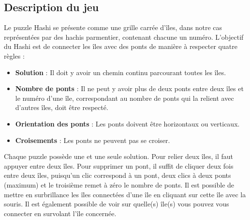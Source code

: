 \subsection{Description du jeu}
Le puzzle Hashi se présente comme une grille carrée d'îles, dans notre cas représentées par des hachis parmentier, contenant chacune un numéro. 
L'objectif du Hashi est de connecter les îles avec des ponts de manière à respecter quatre règles :
\begin{itemize}
\item \textbf{Solution} : Il doit y avoir un chemin continu parcourant toutes les îles.
\item \textbf{Nombre de ponts} : Il ne peut y avoir plus de deux ponts entre deux îles et le numéro d'une île, correspondant au nombre de ponts qui la relient avec d'autres îles, doit être respecté.
\item \textbf{Orientation des ponts} : Les ponts doivent être horizontaux ou verticaux.
\item \textbf{Croisements} :  Les ponts ne peuvent pas se croiser.
\end{itemize}
Chaque puzzle possède une et une seule solution. Pour relier deux îles, il faut appuyer entre deux îles. Pour supprimer un pont, il suffit de cliquer deux fois entre deux îles, puisqu'un clic correspond à un pont, deux clics à deux ponts (maximum) et le troisième remet à zéro le nombre de ponts.
Il est possible de mettre en surbrillance les îles connectées d'une île en cliquant sur cette île avec la souris. Il est également possible de voir sur quelle(s) île(s) vous pouvez vous connecter en survolant l’île concernée. 
